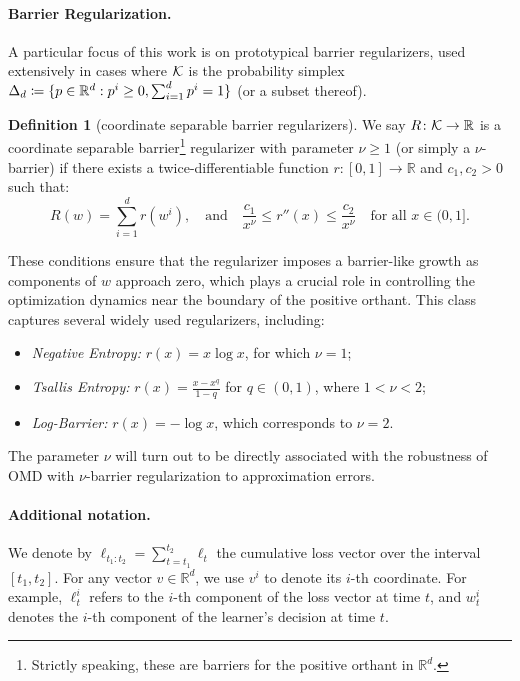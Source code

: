 \documentclass[10pt]{article}
\newif\ifopt
\newcommand{\notopt}[1]{\ifopt\else #1\fi}
\theoremstyle{definition}
\newtheorem{definition}[theorem]{Definition}
\theoremstyle{remark}
\newcommand{\R}{\mathbb{R}}
\newcommand{\barconst}{\nu}
\begin{document}
\paragraph{Barrier Regularization.}
% 
A particular focus of this work is on prototypical barrier regularizers, used extensively in cases where $\mathcal K$ is the probability simplex  $\Delta_d \eqq \cbr[s]{p\in \R^d : p^i \geq 0, \sum_{i=1}^d p^i = 1} $ (or a subset thereof).
% 
\begin{definition}[coordinate separable barrier regularizers]\label{def:nu_barrier}
We say $R\colon \cK \to \R$ is a coordinate separable barrier\footnote{Strictly speaking, these are barriers for the positive orthant in $\R^d$.} regularizer with parameter $\barconst\geq1$ (or simply a $\barconst$-barrier) 
if there exists a twice-differentiable function \(r \colon [0,1] \to \mathbb{R}\) and $c_1,c_2>0$ such that:
\[
R(w) = \sum_{i=1}^d r(w^i),
\quad \text{and} \quad 
\frac{c_1}{x^\barconst} \leq r''(x) \leq \frac{c_2}{x^\barconst} \quad \text{for all } x \in (0,1].
\]
\end{definition}
% 
These conditions ensure that the regularizer imposes a barrier-like growth as components of \(w\) approach zero, which plays a crucial role in controlling the optimization dynamics near the boundary of the positive orthant.
%
This class captures several widely used regularizers, including: 
\begin{itemize}[nosep]
    \item \emph{Negative Entropy:} \(r(x) = x \log x\), for which $\barconst=1$;
    \item \emph{Tsallis Entropy:} \(r(x) = \frac{x - x^q}{1 - q}\) for \(q \in (0,1)\), where $1<\barconst<2$;
    \item \emph{Log-Barrier:} \(r(x) = -\log x\), which corresponds to $\barconst=2$.
\end{itemize}
The parameter $\barconst$ will turn out to be directly associated with the robustness of OMD with $\barconst$-barrier regularization to approximation errors.

\notopt{
\paragraph{Additional notation.}  
We denote by \(\ell_{t_1:t_2} = \sum_{t = t_1}^{t_2} \ell_t\) the cumulative loss vector over the interval \([t_1, t_2]\). For any vector \(v \in \mathbb{R}^d\), we use \(v^i\) to denote its \(i\)-th coordinate. For example, \(\ell_t^i\) refers to the \(i\)-th component of the loss vector at time \(t\), and \(w_t^i\) denotes the \(i\)-th component of the learner's decision at time \(t\).
}
\end{document}

